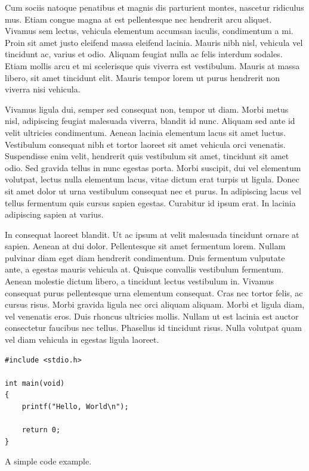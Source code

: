 Cum sociis natoque penatibus et magnis dis parturient montes, nascetur ridiculus mus. Etiam congue magna at est pellentesque nec hendrerit arcu aliquet. Vivamus sem lectus, vehicula elementum accumsan iaculis, condimentum a mi. Proin sit amet justo eleifend massa eleifend lacinia. Mauris nibh nisl, vehicula vel tincidunt ac, varius et odio. Aliquam feugiat nulla ac felis interdum sodales. Etiam mollis arcu et mi scelerisque quis viverra est vestibulum. Mauris at massa libero, sit amet tincidunt elit. Mauris tempor lorem ut purus hendrerit non viverra nisi vehicula.

Vivamus ligula dui, semper sed consequat non, tempor ut diam. Morbi metus nisl, adipiscing feugiat malesuada viverra, blandit id nunc. Aliquam sed ante id velit ultricies condimentum. Aenean lacinia elementum lacus sit amet luctus. Vestibulum consequat nibh et tortor laoreet sit amet vehicula orci venenatis. Suspendisse enim velit, hendrerit quis vestibulum sit amet, tincidunt sit amet odio. Sed gravida tellus in nunc egestas porta. Morbi suscipit, dui vel elementum volutpat, lectus nulla elementum lacus, vitae dictum erat turpis ut ligula. Donec sit amet dolor ut urna vestibulum consequat nec et purus. In adipiscing lacus vel tellus fermentum quis cursus sapien egestas. Curabitur id ipsum erat. In lacinia adipiscing sapien at varius.

In consequat laoreet blandit. Ut ac ipsum at velit malesuada tincidunt ornare at sapien. Aenean at dui dolor. Pellentesque sit amet fermentum lorem. Nullam pulvinar diam eget diam hendrerit condimentum. Duis fermentum vulputate ante, a egestas mauris vehicula at. Quisque convallis vestibulum fermentum. Aenean molestie dictum libero, a tincidunt lectus vestibulum in. Vivamus consequat purus pellentesque urna elementum consequat. Cras nec tortor felis, ac cursus risus. Morbi gravida ligula nec orci aliquam aliquam. Morbi et ligula diam, vel venenatis eros. Duis rhoncus ultricies mollis. Nullam ut est lacinia est auctor consectetur faucibus nec tellus. Phasellus id tincidunt risus. Nulla volutpat quam vel diam vehicula in egestas ligula laoreet.

\begin{listing}[t]
\begin{lstlisting}
#include <stdio.h>

int main(void)
{
	printf("Hello, World\n");

	return 0;
}
\end{lstlisting}
\caption{A simple code example.}
\label{lst:example}
\end{listing}

